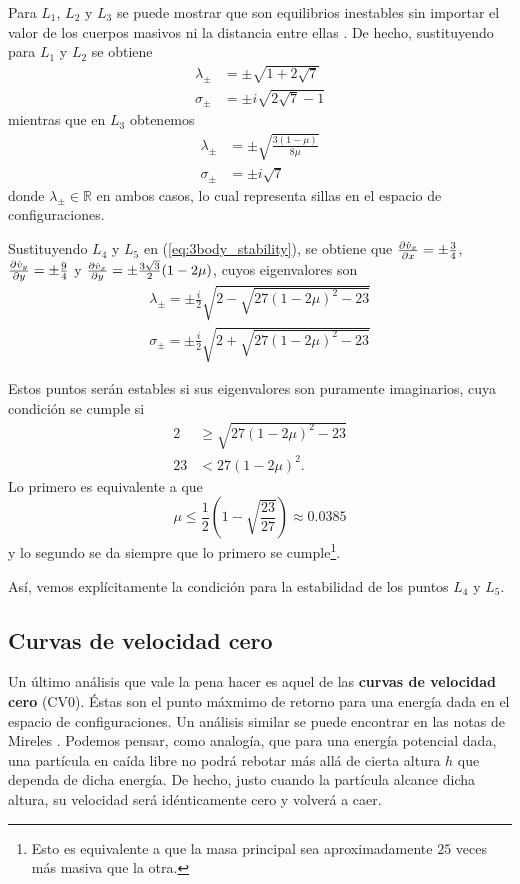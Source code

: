 Para $L_1$, $L_2$ y $L_3$ se puede mostrar que son equilibrios inestables sin importar el valor de los cuerpos masivos ni la distancia entre ellas \cite{MirelesJames2006}. De hecho, sustituyendo para $L_1$ y $L_2$ se obtiene
\begin{align*}
 \lambda_\pm &= \pm  \sqrt{1 + 2\sqrt{7}} \\
 \sigma_\pm &= \pm i \sqrt{2\sqrt{7} - 1}
\end{align*}
mientras que en $L_3$ obtenemos 
\begin{align*}
 \lambda_\pm &= \pm \sqrt{ \frac{3(1 - \mu)}{8\mu} } \\
 \sigma_\pm &= \pm i \sqrt{7}
\end{align*}
donde $\lambda_\pm \in \mathbb{R}$ en ambos casos, lo cual representa sillas en el espacio de configuraciones.

Sustituyendo $L_4$ y $L_5$ en (\ref{eq:3body_stability}), se obtiene que $\frac{\partial \dot{v}_x}{\partial x} = \pm \frac{3}{4}$, $\frac{\partial \dot{v}_y}{\partial y} = \pm \frac{9}{4}$ y $\frac{\partial \dot{v}_x}{\partial y} = \pm \frac{3\sqrt{3}}{2} (1-2\mu) $, cuyos eigenvalores son
\begin{align*}
 \lambda_\pm = \pm \frac{i}{2} \sqrt{ 2 - \sqrt{27(1-2\mu)^2 - 23} } \\
 \sigma_\pm = \pm \frac{i}{2} \sqrt{ 2 + \sqrt{27(1-2\mu)^2 - 23} } 
 \end{align*}

Estos puntos serán estables si sus eigenvalores son puramente imaginarios, cuya condición se cumple si 
\begin{align*}
 2 &\geq \sqrt{27(1-2\mu)^2 - 23} \\
 23 &< 27(1-2\mu)^2.
\end{align*}
Lo primero es equivalente a que 
\begin{equation}
 \mu \leq \frac{1}{2} \left(1 - \sqrt{\frac{23}{27}} \right) \approx 0.0385
 \label{eq:mu_critica}
\end{equation}
y lo segundo se da siempre que lo primero se cumple\footnote{Esto es equivalente a que la masa principal sea aproximadamente $25$ veces más masiva que la otra.}.

Así, vemos explícitamente la condición para la estabilidad de los puntos $L_4$ y $L_5$. 

\subsection{Curvas de velocidad cero}
\label{sec:zvc}

Un último análisis que vale la pena hacer es aquel de las \textbf{curvas de velocidad cero} (CV0). Éstas son el punto máxmimo de retorno para una energía dada en el espacio de configuraciones. Un análisis similar se puede encontrar en las notas de Mireles \cite{MirelesJames2006}. Podemos pensar, como analogía, que para una energía potencial dada, una partícula en caída libre no podrá rebotar más allá de cierta altura $h$ que dependa de dicha energía. De hecho, justo cuando la partícula alcance dicha altura, su velocidad será idénticamente cero y volverá a caer. 

